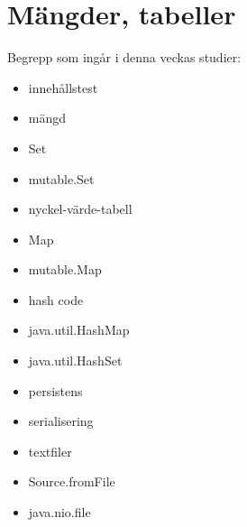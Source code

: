 \chapter{Mängder, tabeller}\label{chapter:W09}
Begrepp som ingår i denna veckas studier:
\begin{itemize}[noitemsep,label={$\square$},leftmargin=*]
\item innehållstest
\item mängd
\item Set
\item mutable.Set
\item nyckel-värde-tabell
\item Map
\item mutable.Map
\item hash code
\item java.util.HashMap
\item java.util.HashSet
\item persistens
\item serialisering
\item textfiler
\item Source.fromFile
\item java.nio.file\end{itemize}
